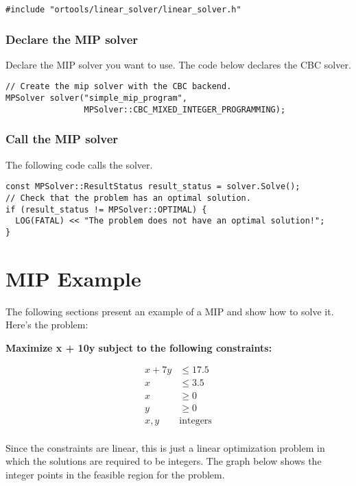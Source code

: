 \documentclass[a4paper,12pt,notitlepage,twoside,openright]{article}
\begin{document}
\begin{verbatim}
#include "ortools/linear_solver/linear_solver.h"
\end{verbatim}

\subsubsection{Declare the MIP solver}

Declare the MIP solver you want to use. The code below declares the CBC solver.

\begin{verbatim}
// Create the mip solver with the CBC backend.
MPSolver solver("simple_mip_program",
                MPSolver::CBC_MIXED_INTEGER_PROGRAMMING);
\end{verbatim}

\subsubsection{Call the MIP solver}

The following code calls the solver.

\begin{verbatim}
const MPSolver::ResultStatus result_status = solver.Solve();
// Check that the problem has an optimal solution.
if (result_status != MPSolver::OPTIMAL) {
  LOG(FATAL) << "The problem does not have an optimal solution!";
}
\end{verbatim}

\section{MIP Example}

The following sections present an example of a MIP and show how to solve it. Here's the problem:

\textbf{Maximize x + 10y subject to the following constraints:}

\begin{align*}
x + 7y &\leq 17.5 \\
x      &\leq  3.5 \\
x      &\geq  0   \\
y      &\geq  0   \\
x, y\; &\text{integers} \\
\end{align*}

Since the constraints are linear, this is just a linear optimization problem in which the solutions are required to be integers. The graph below shows the integer points in the feasible region for the problem.
\end{document}
